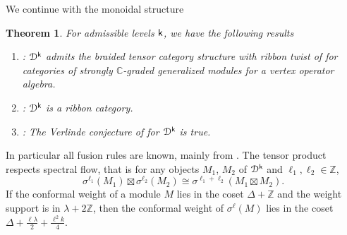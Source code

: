 \documentclass[a4paper, reqno]{amsart}
\newtheorem{theorem}{Theorem}[section]
\theoremstyle{introTheorems}
\def\CC{\mathbb{C}}
\def\ZZ{\mathbb{Z}}
\newcommand\cD{\mathcal{D}}
\renewcommand{\1}{\mathbbold{1}}
\begin{document}
We continue with the monoidal structure

\begin{theorem}
    For admissible levels $\mathsf{k}$, we have the following results
    \begin{enumerate}
        \item \cite{Cr24}: $\cD^\k$ admits the braided tensor category structure with ribbon twist of \cite{HLZ06} for categories of strongly $\CC$-graded generalized modules for a vertex operator algebra. 
        \item \cites{CMY1, NORW24}: $\cD^\k$ is a ribbon category. 
        \item \cite{Cr3}: The Verlinde conjecture of \cites{CR1, CR2} for $\cD^\k$ is true. 
    \end{enumerate}
\end{theorem}
In particular all fusion rules are known, mainly from \cites{Cr3, NORW24}.
The tensor product respects spectral flow, that is for any objects $M_1$, $M_2$ of $\cD^\k$ and $\ell_1,\ell_2\in\ZZ$, 
   \[
   \sigma^{\ell_1}(M_1)\boxtimes\sigma^{\ell_2}(M_2)\cong\sigma^{\ell_1+\ell_2}(M_1\boxtimes M_2).
   \]
If the conformal weight of a module $M$ lies in the coset $\Delta + \ZZ$ and the weight support is in $\lambda  + 2\ZZ$, then the conformal weight of $\sigma^\ell(M)$ lies in the coset $\Delta + \frac{\ell \lambda}{2}+ \frac{\ell^2 k }{4}$.
\end{document}
